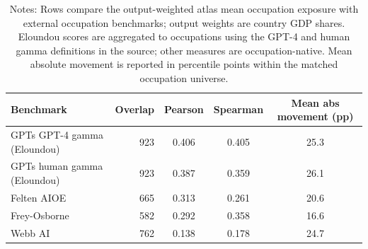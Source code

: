 \begin{table}[H]
\centering
\footnotesize
\caption{Occupation-level comparison of the reported output-weighted global summary against external occupation benchmarks.}
\begin{tabular}{p{}rccc}
\toprule
Benchmark & Overlap & Pearson & Spearman & Mean abs movement (pp) \\
\midrule
GPTs GPT-4 gamma (Eloundou) & 923 & 0.406 & 0.405 & 25.3 \\
GPTs human gamma (Eloundou) & 923 & 0.387 & 0.359 & 26.1 \\
Felten AIOE & 665 & 0.313 & 0.261 & 20.6 \\
Frey-Osborne & 582 & 0.292 & 0.358 & 16.6 \\
Webb AI & 762 & 0.138 & 0.178 & 24.7 \\
\bottomrule
\end{tabular}

\caption*{\scriptsize Notes: Rows compare the output-weighted atlas mean occupation exposure with external occupation benchmarks; output weights are country GDP shares. Eloundou scores are aggregated to occupations using the GPT-4 and human gamma definitions in the source; other measures are occupation-native. Mean absolute movement is reported in percentile points within the matched occupation universe.}
\label{tab:appendix_occ_external}
\end{table}
